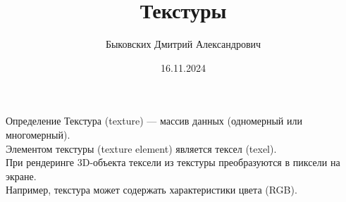 \documentclass{beamer}
\title[Сплайны]{Текстуры}
\author[Быковских Д.А.]{Быковских Дмитрий Александрович}
\date{16.11.2024}
\begin{document}
	\begin{frame}
		\titlepage
	\end{frame}




	\begin{frame}{Определение}
		Текстура (texture) --- массив данных (одномерный или многомерный).\\
		Элементом текстуры (texture element) является тексел (texel).\\
		
		При рендеринге 3D-объекта тексели из текстуры преобразуются в пиксели на экране.\\
		Например, текстура может содержать характеристики цвета (RGB).\\
				



	\end{frame}
\end{document}
